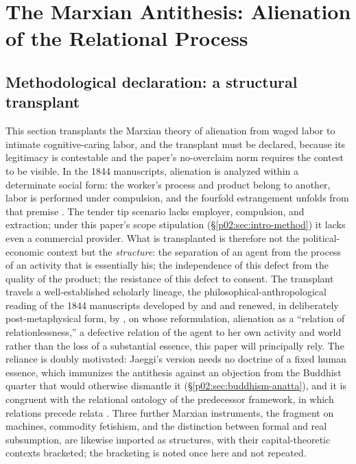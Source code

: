 \section{The Marxian Antithesis: Alienation of the Relational Process}
\label{p02:sec:marx}

\subsection{Methodological declaration: a structural transplant}
\label{p02:sec:marx-method}

This section transplants the Marxian theory of alienation from waged labor to intimate cognitive-caring labor, and the transplant must be declared, because its legitimacy is contestable and the paper's no-overclaim norm requires the contest to be visible. In the 1844 manuscripts, alienation is analyzed within a determinate social form: the worker's process and product belong to another, labor is performed under compulsion, and the fourfold estrangement unfolds from that premise \parencite{marx1844economic}. The tender tip scenario lacks employer, compulsion, and extraction; under this paper's scope stipulation (\S\ref{p02:sec:intro-method}) it lacks even a commercial provider. What is transplanted is therefore not the political-economic context but the \emph{structure}: the separation of an agent from the process of an activity that is essentially his; the independence of this defect from the quality of the product; the resistance of this defect to consent. The transplant travels a well-established scholarly lineage, the philosophical-anthropological reading of the 1844 manuscripts developed by \textcite{fromm1961marx} and \textcite{ollman1971alienation} and renewed, in deliberately post-metaphysical form, by \textcite{jaeggi2014alienation}, on whose reformulation, alienation as a ``relation of relationlessness,'' a defective relation of the agent to her own activity and world rather than the loss of a substantial essence, this paper will principally rely. The reliance is doubly motivated: Jaeggi's version needs no doctrine of a fixed human essence, which immunizes the antithesis against an objection from the Buddhist quarter that would otherwise dismantle it (\S\ref{p02:sec:buddhism-anatta}), and it is congruent with the relational ontology of the predecessor framework, in which relations precede relata \parencite{huang2025relational}. Three further Marxian instruments, the fragment on machines, commodity fetishism, and the distinction between formal and real subsumption, are likewise imported as structures, with their capital-theoretic contexts bracketed; the bracketing is noted once here and not repeated.

